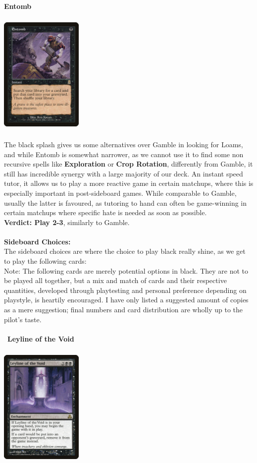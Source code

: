 \documentclass{report}
\begin{document}
\textbf{Entomb\\}
\begin{center}
\includegraphics [width = 4cm, height = 6cm] {entomb}
\end{center}
The black splash gives us some alternatives over Gamble in looking for Loams, and while Entomb is somewhat narrower, as we cannot use it to find some non recursive spells like \textbf{Exploration} or \textbf{Crop Rotation}, differently from Gamble, it still has incredible synergy with a large majority of our deck. An instant speed tutor, it allows us to play a more reactive game in certain matchups, where this is especially important in post-sideboard games. While comparable to Gamble, usually the latter is favoured, as tutoring to hand can often be game-winning in certain matchups where specific hate is needed as soon as possible.\\
\textbf{Verdict: Play 2-3}, similarly to Gamble.\\\\
\textbf{Sideboard Choices:\\}
The sideboard choices are where the choice to play black really shine, as we get to play the following cards:\\
Note: The following cards are merely potential options in black. They are not to be played all together, but a mix and match of cards and their respective quantities, developed through playtesting and personal preference depending on playstyle, is heartily encouraged. I have only listed a suggested amount of copies as a mere suggestion; final numbers and card distribution are wholly up to the pilot's taste.\\\\\
\textbf{Leyline of the Void\\}
\begin{center}
\includegraphics [width = 4cm, height = 6cm] {leyline-of-the-void}
\end{center}
\end{document}
